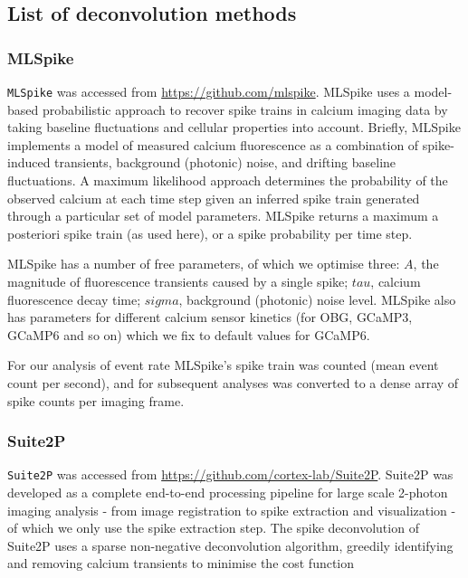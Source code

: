 \documentclass[a4paper,11pt]{article}
\begin{document}
\subsection*{List of deconvolution methods}

\subsubsection*{MLSpike}
\texttt{MLSpike} \citep{Deneux2016-gu} was accessed from \href{https://github.com/mlspike}{https://github.com/mlspike}. MLSpike uses a model-based probabilistic approach to recover spike trains in calcium imaging data by taking baseline fluctuations and cellular properties into account. Briefly, MLSpike implements a model of measured calcium fluorescence as a combination of spike-induced transients, background (photonic) noise, and drifting baseline fluctuations. A maximum likelihood approach determines the probability of the observed calcium at each time step given an inferred spike train generated through a particular set of model parameters. MLSpike returns a maximum a posteriori spike train (as used here), or a spike probability per time step.

MLSpike has a number of free parameters, of which we optimise three: $A$, the magnitude of fluorescence transients caused by a single spike; $tau$, calcium fluorescence decay time; $sigma$, background (photonic) noise level. MLSpike also has parameters for different calcium sensor kinetics (for OBG, GCaMP3, GCaMP6 and so on) which we fix to default values for GCaMP6. 

For our analysis of event rate MLSpike's spike train was counted (mean event count per second), and for subsequent analyses was converted to a dense array of spike counts per imaging frame.



\subsubsection*{Suite2P}
\texttt{Suite2P} \citep{Pachitariu2016-ui,Pachitariu2018-cj} was accessed from \href{https://github.com/cortex-lab/Suite2P}{https://github.com/cortex-lab/Suite2P}. Suite2P was developed as a complete end-to-end processing pipeline for large scale 2-photon imaging analysis - from image registration to spike extraction and visualization - of which we only use the spike extraction step. The spike deconvolution of Suite2P uses a sparse non-negative deconvolution algorithm, greedily identifying and removing calcium transients to minimise the cost function 
\end{document}

